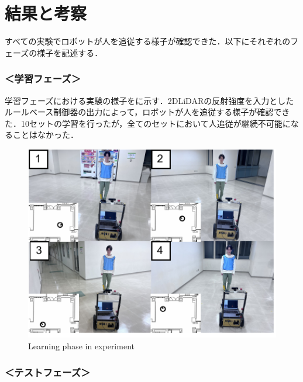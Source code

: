 \newpage

\section{結果と考察}

  すべての実験でロボットが人を追従する様子が確認できた．以下にそれぞれのフェーズの様子を記述する．

  \subsubsection*{＜学習フェーズ＞}
  
  学習フェーズにおける実験の様子をに示す．2DLiDARの反射強度を入力としたルールベース制御器の出力によって，ロボットが人を追従する様子が確認できた．10セットの学習を行ったが，全てのセットにおいて人追従が継続不可能になることはなかった．

\vspace{1cm}

  \begin{figure}[h]
    \centering
    \includegraphics[width=13cm] {images/pdf/RobotGuidance_exp_learning_phase}
    \captionsetup{justification=raggedright} %
    \caption{Learning phase in experiment}
    \label{Fig:Learning phase in experiment}
  \end{figure}

\newpage

  \subsubsection*{＜テストフェーズ＞}
  
